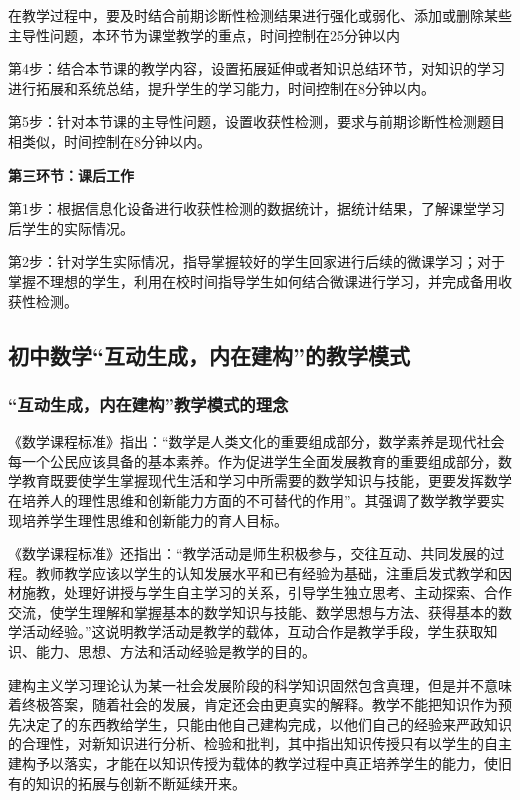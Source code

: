 \documentclass{article}
\begin{document}
在教学过程中，要及时结合前期诊断性检测结果进行强化或弱化、添加或删除某些主导性问题，本环节为课堂教学的重点，时间控制在25分钟以内

第4步：结合本节课的教学内容，设置拓展延伸或者知识总结环节，对知识的学习进行拓展和系统总结，提升学生的学习能力，时间控制在8分钟以内。

第5步：针对本节课的主导性问题，设置收获性检测，要求与前期诊断性检测题目相类似，时间控制在8分钟以内。

\textbf{第三环节：课后工作}

第1步：根据信息化设备进行收获性检测的数据统计，据统计结果，了解课堂学习后学生的实际情况。

第2步：针对学生实际情况，指导掌握较好的学生回家进行后续的微课学习；对于掌握不理想的学生，利用在校时间指导学生如何结合微课进行学习，并完成备用收获性检测。




\subsection{初中数学“互动生成，内在建构”的教学模式}
\subsubsection{“互动生成，内在建构”教学模式的理念}
《数学课程标准》指出：“数学是人类文化的重要组成部分，数学素养是现代社会每一个公民应该具备的基本素养。作为促进学生全面发展教育的重要组成部分，数学教育既要使学生掌握现代生活和学习中所需要的数学知识与技能，更要发挥数学在培养人的理性思维和创新能力方面的不可替代的作用”。其强调了数学教学要实现培养学生理性思维和创新能力的育人目标。

《数学课程标准》还指出：“教学活动是师生积极参与，交往互动、共同发展的过程。教师教学应该以学生的认知发展水平和已有经验为基础，注重启发式教学和因材施教，处理好讲授与学生自主学习的关系，引导学生独立思考、主动探索、合作交流，使学生理解和掌握基本的数学知识与技能、数学思想与方法、获得基本的数学活动经验。”这说明教学活动是教学的载体，互动合作是教学手段，学生获取知识、能力、思想、方法和活动经验是教学的目的。

建构主义学习理论认为某一社会发展阶段的科学知识固然包含真理，但是并不意味着终极答案，随着社会的发展，肯定还会由更真实的解释。教学不能把知识作为预先决定了的东西教给学生，只能由他自己建构完成，以他们自己的经验来严政知识的合理性，对新知识进行分析、检验和批判，其中指出知识传授只有以学生的自主建构予以落实，才能在以知识传授为载体的教学过程中真正培养学生的能力，使旧有的知识的拓展与创新不断延续开来。
\end{document}
